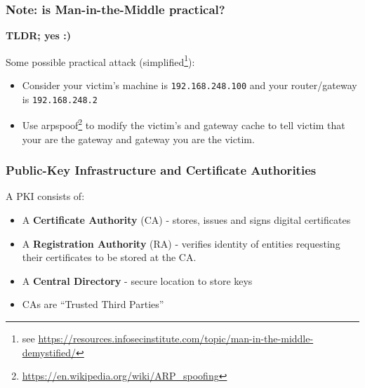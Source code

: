\documentclass[
hyperref={pdfpagelabels=false}
,xcolor=table
]
{beamer}
\begin{document}
\begin{frame}
  \frametitle{Note: is Man-in-the-Middle practical?}

  \textbf{TLDR; yes :)}
  
  Some possible practical attack (simplified\footnote{\tiny see
    \url{https://resources.infosecinstitute.com/topic/man-in-the-middle-demystified/}}):

  \begin{itemize}
  \item Consider your victim's machine is \texttt{192.168.248.100} and
    your router/gateway is \texttt{192.168.248.2}
  \item Use
    arpspoof\footnote{\tiny \url{https://en.wikipedia.org/wiki/ARP_spoofing}}
    to modify the victim's and gateway cache to tell victim that your
    are the gateway and gateway you are the victim.
  \end{itemize}


  
\end{frame}





\begin{frame}
  \frametitle{Public-Key Infrastructure and Certificate Authorities}
  A PKI consists of: 
  \begin{itemize}
  \item A \textbf{Certificate Authority} (CA) - stores, issues and signs digital certificates
  \item A \textbf{Registration Authority} (RA) - verifies identity of entities requesting their certificates to be stored at the CA. 
  \item A \textbf{Central Directory} - secure location to store keys 
  \end{itemize}

  \begin{itemize}
  \item CAs are ``Trusted Third Parties''
  \end{itemize}
\end{frame}
\end{document}
